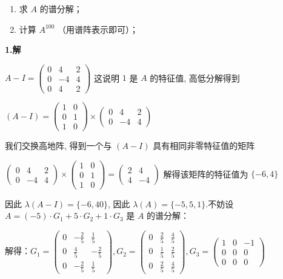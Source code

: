 \documentclass{article}
\begin{document}
\begin{enumerate}
	\item 求 $A$ 的谱分解；
	\item 计算 $A^{100}$ （用谱阵表示即可）；
\end{enumerate}

\par \textbf{1.解}

$A-I=\begin{pmatrix}
	0 & 4 & 2\\
	0 & -4 & 4\\
	0 & 4 & 2
\end{pmatrix}$ 这说明 $1$ 是 $A$ 的特征值, 高低分解得到

$(A-I)=\begin{pmatrix}
	1 & 0\\
	0 & 1\\
	1 & 0
\end{pmatrix} \times \begin{pmatrix}
	0 & 4 & 2\\
	0 & -4 & 4
\end{pmatrix}$

我们交换高地阵, 得到一个与 $(A-I)$ 具有相同非零特征值的矩阵

$ \begin{pmatrix}
	0 & 4 & 2\\
	0 & -4 & 4
\end{pmatrix}\times \begin{pmatrix}
1 & 0\\
0 & 1\\
1 & 0
\end{pmatrix}=\begin{pmatrix}
	2 & 4 \\
	4 & -4
\end{pmatrix}$ 解得该矩阵的特征值为 $\{-6, 4\}$

因此 $\lambda(A-I)=\{-6, 4 0\}$, 因此 $\lambda(A)=\{-5, 5, 1\}$.不妨设 $A=(-5)\cdot G_1 + 5\cdot G_2 + 1\cdot G_3$ 是 $A$ 的谱分解：

解得：$G_1=\begin{pmatrix}
	0 & -\frac{2}{5} & \frac{1}{5}\\
	0 & \frac{4}{5} & -\frac{2}{5}\\
	0 & -\frac{2}{5} & \frac{1}{5}
\end{pmatrix}, G_2=\begin{pmatrix}
	0 & \frac{2}{5} & \frac{4}{5}\\
	0 & \frac{1}{5} & \frac{2}{5}\\
	0 & \frac{2}{5} & \frac{4}{5}
\end{pmatrix}, G_3=\begin{pmatrix}
	1 & 0 & -1\\
	0 & 0 & 0\\
	0 & 0 & 0
\end{pmatrix}$
\end{document}
